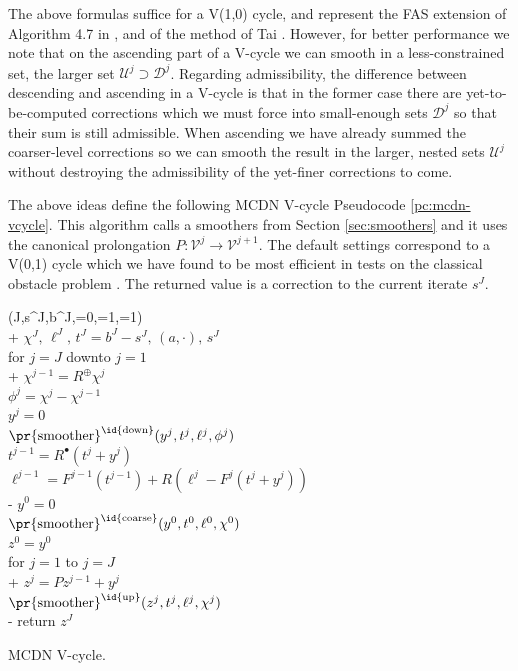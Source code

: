 \documentclass[letterpaper,final,12pt,reqno]{amsart}
\theoremstyle{claim}
\newcommand{\ip}[2]{\left(#1,#2\right)}
\newcommand{\mR}{R^{\bm{\oplus}}}
\newcommand{\iR}{R^{\bullet}}
\numberwithin{equation}{section}
\numberwithin{figure}{section}
\numberwithin{table}{section}
\numberwithin{theorem}{section}
\begin{document}
The above formulas suffice for a V(1,0) cycle, and represent the FAS extension of Algorithm 4.7 in \cite{GraeserKornhuber2009}, and of the method of Tai \cite{Tai2003}.  However, for better performance we note that on the ascending part of a V-cycle we can smooth in a less-constrained set, the larger set $\mathcal{U}^j \supset \mathcal{D}^j$.  Regarding admissibility, the difference between descending and ascending in a V-cycle is that in the former case there are yet-to-be-computed corrections which we must force into small-enough sets $\mathcal{D}^j$ so that their sum is still admissible.  When ascending we have already summed the coarser-level corrections so we can smooth the result in the larger, nested sets $\mathcal{U}^j$ without destroying the admissibility of the yet-finer corrections to come.

The above ideas define the following MCDN V-cycle Pseudocode \ref{pc:mcdn-vcycle}.  This algorithm calls a smoothers from Section \ref{sec:smoothers} and it uses the canonical prolongation $P:\mathcal{V}^j \to \mathcal{V}^{j+1}$.  The default settings correspond to a V(0,1) cycle which we have found to be most efficient in tests on the classical obstacle problem \cite{Bueler2022}.  The returned value is a correction to the current iterate $s^J$.

\begin{pcode}[ht]
\begin{pseudo*}
(J,s^J,b^J,=0,=1,=1)\text{:} \\+
    $\chi^J, \,\ell^J, \,t^J = b^J - s^J, \,\ip{a}{\cdot}, \,s^J$ \\
    for $j=J$ downto $j=1$ \\+
      $\chi^{j-1} = \mR \chi^j$ \\
      $\phi^j = \chi^j - \chi^{j-1}$ \\
      $y^j = 0$ \\
      $\text{\pr{smoother}}^{\text{\id{down}}}(y^j,t^j,\ell^j,\phi^j)$ \qquad \qquad {} \\
      $t^{j-1} = \iR(t^j + y^j)$ \\
      $\ell^{j-1} = F^{j-1}(t^{j-1}) + R(\ell^j - F^j(t^j+y^j))$ \\-
    $y^0 = 0$ \\
    $\text{\pr{smoother}}^{\text{\id{coarse}}}(y^0,t^0,\ell^0,\chi^0)$ \qquad \qquad {} \\
    $z^0 = y^0$ \\
    for $j=1$ to $j=J$ \\+
      $z^j = P z^{j-1} + y^{j}$ \\
      $\text{\pr{smoother}}^{\text{\id{up}}}(z^j,t^j,\ell^j,\chi^j)$ \qquad \qquad {} \\-
    return $z^J$
\end{pseudo*}
\caption{MCDN V-cycle.}
\label{pc:mcdn-vcycle}
\end{pcode}
\end{document}

